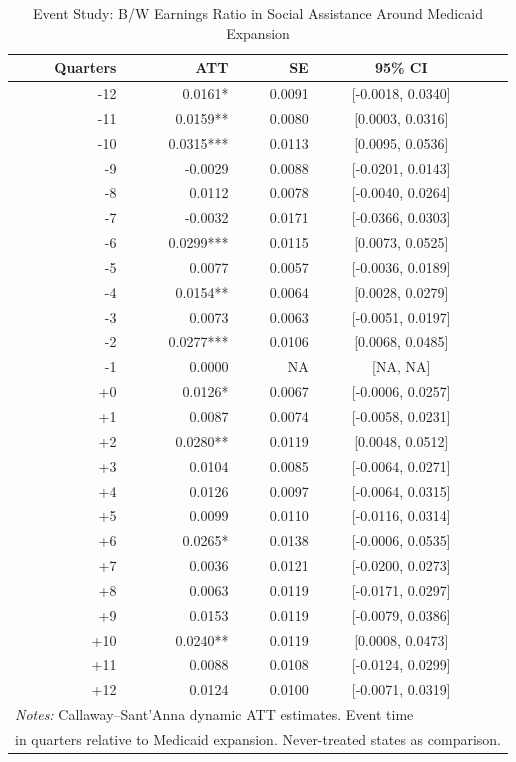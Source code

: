 \begin{table}[t]
\centering
\caption{Event Study: B/W Earnings Ratio in Social Assistance Around Medicaid Expansion}
\label{tab:eventstudy}
\begin{tabular}{rrrcc}
\hline\hline
Quarters & ATT & SE & 95\% CI & \\
\hline
-12 & 0.0161* & 0.0091 & [-0.0018, 0.0340] & \\
-11 & 0.0159** & 0.0080 & [0.0003, 0.0316] & \\
-10 & 0.0315*** & 0.0113 & [0.0095, 0.0536] & \\
-9 & -0.0029 & 0.0088 & [-0.0201, 0.0143] & \\
-8 & 0.0112 & 0.0078 & [-0.0040, 0.0264] & \\
-7 & -0.0032 & 0.0171 & [-0.0366, 0.0303] & \\
-6 & 0.0299*** & 0.0115 & [0.0073, 0.0525] & \\
-5 & 0.0077 & 0.0057 & [-0.0036, 0.0189] & \\
-4 & 0.0154** & 0.0064 & [0.0028, 0.0279] & \\
-3 & 0.0073 & 0.0063 & [-0.0051, 0.0197] & \\
-2 & 0.0277*** & 0.0106 & [0.0068, 0.0485] & \\
-1 & 0.0000 & NA & [NA, NA] & \\
+0 & 0.0126* & 0.0067 & [-0.0006, 0.0257] & \\
+1 & 0.0087 & 0.0074 & [-0.0058, 0.0231] & \\
+2 & 0.0280** & 0.0119 & [0.0048, 0.0512] & \\
+3 & 0.0104 & 0.0085 & [-0.0064, 0.0271] & \\
+4 & 0.0126 & 0.0097 & [-0.0064, 0.0315] & \\
+5 & 0.0099 & 0.0110 & [-0.0116, 0.0314] & \\
+6 & 0.0265* & 0.0138 & [-0.0006, 0.0535] & \\
+7 & 0.0036 & 0.0121 & [-0.0200, 0.0273] & \\
+8 & 0.0063 & 0.0119 & [-0.0171, 0.0297] & \\
+9 & 0.0153 & 0.0119 & [-0.0079, 0.0386] & \\
+10 & 0.0240** & 0.0119 & [0.0008, 0.0473] & \\
+11 & 0.0088 & 0.0108 & [-0.0124, 0.0299] & \\
+12 & 0.0124 & 0.0100 & [-0.0071, 0.0319] & \\
\hline
\multicolumn{5}{l}{\footnotesize \textit{Notes:} Callaway--Sant'Anna dynamic ATT estimates. Event time}\\
\multicolumn{5}{l}{\footnotesize in quarters relative to Medicaid expansion. Never-treated states as comparison.}\\
\hline\hline
\end{tabular}
\end{table}

